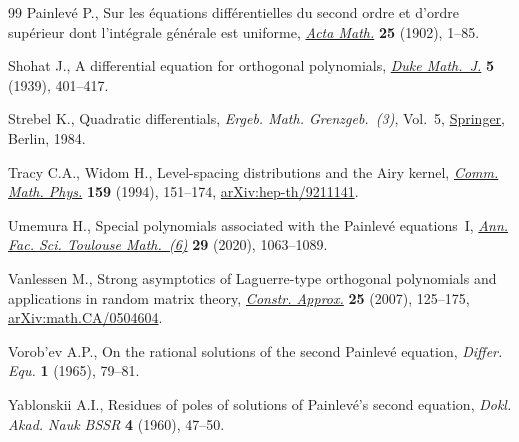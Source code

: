 \begin{thebibliography}{99}
Painlev\'e P., Sur les \'equations diff\'erentielles du second ordre et d'ordre
 sup\'erieur dont l'int\'egrale g\'en\'erale est uniforme,
 \href{https://doi.org/10.1007/BF02419020}{\textit{Acta Math.}} \textbf{25}
 (1902), 1--85.

Shohat J., A differential equation for orthogonal polynomials,
 \href{https://doi.org/10.1215/S0012-7094-39-00534-X}{\textit{Duke Math.~J.}}
 \textbf{5} (1939), 401--417.

Strebel K., Quadratic differentials, \textit{Ergeb. Math. Grenzgeb.~(3)},
 Vol.~5, \href{https://doi.org/10.1007/978-3-662-02414-0}{Springer}, Berlin,
 1984.

Tracy C.A., Widom H., Level-spacing distributions and the {A}iry kernel,
 \href{https://doi.org/10.1007/BF02100489}{\textit{Comm. Math. Phys.}}
 \textbf{159} (1994), 151--174,
 \href{http://arxiv.org/abs/hep-th/9211141}{arXiv:hep-th/9211141}.

Umemura H., Special polynomials associated with the {P}ainlev\'e equations~{I},
 \href{https://doi.org/10.5802/afst.1657}{\textit{Ann. Fac. Sci. Toulouse
 Math.~(6)}} \textbf{29} (2020), 1063--1089.

Vanlessen M., Strong asymptotics of {L}aguerre-type orthogonal polynomials and
 applications in random matrix theory,
 \href{https://doi.org/10.1007/s00365-005-0611-z}{\textit{Constr. Approx.}}
 \textbf{25} (2007), 125--175,
 \href{http://arxiv.org/abs/math.CA/0504604}{arXiv:math.CA/0504604}.

Vorob'ev A.P., On the rational solutions of the second {P}ainlev\'e equation,
 \textit{Differ. Equ.} \textbf{1} (1965), 79--81.

Yablonskii A.I., Residues of poles of solutions of Painlev\'e's second
 equation, \textit{Dokl. Akad. Nauk BSSR} \textbf{4} (1960), 47--50.

\end{thebibliography}

